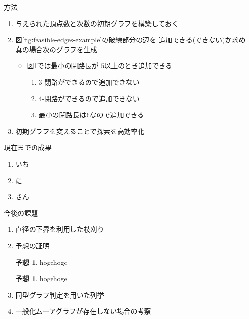 \documentclass[dvipdfmx]{beamer}
\theoremstyle{definition}
\newtheorem{conjecture}[theorem]{予想}
\begin{document}
\begin{frame}{方法}
  \begin{enumerate}
  \item 与えられた頂点数と次数の初期グラフを構築しておく
  \item 図\ref{fig:feasible-edges-example}の破線部分の辺を
    追加できる(できない)か求め真の場合次のグラフを生成
    \begin{itemize}
    \item 図\ref{fig:feasible-edges-example2}では最小の閉路長が
      $5$以上のとき追加できる
      \begin{enumerate}[a]
      \item 3-閉路ができるので追加できない
      \item 4-閉路ができるので追加できない
      \item 最小の閉路長は6なので追加できる
      \end{enumerate}
    \end{itemize}
    \item 初期グラフを変えることで探索を高効率化
  \end{enumerate}
  \begin{figure}
    \centering
    \begin{minipage}{.4\columnwidth}
      \def\svgwidth{\textwidth}
      
      \label{fig:feasible-edges-example}
    \end{minipage}
    \hspace{1em}
    \begin{minipage}{.4\columnwidth}
      \def\svgwidth{\textwidth}
      
      \label{fig:feasible-edges-example2}
    \end{minipage}
  \end{figure}
\end{frame}

\begin{frame}{現在までの成果}
  \begin{enumerate}
  \item いち
  \item に
  \item さん
  \end{enumerate}
\end{frame}

\begin{frame}{今後の課題}
  \begin{enumerate}
  \item 直径の下界を利用した枝刈り
  \item 予想の証明
    \begin{conjecture}
      hogehoge
    \end{conjecture}
    \begin{conjecture}
      hogehoge
    \end{conjecture}
  \item 同型グラフ判定を用いた列挙
  \item 一般化ムーアグラフが存在しない場合の考察
  \end{enumerate}
\end{frame}
\end{document}
